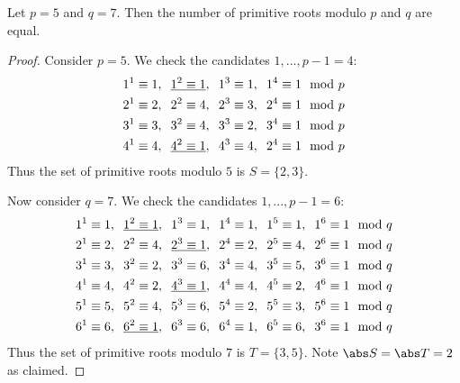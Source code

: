 \documentclass{article}
\begin{document}
\renewcommand{\hs}{\hspace{0.2cm}}
\begin{claim*}[3]
   Let $p=5$ and $q=7$. Then the number of primitive roots modulo $p$ and $q$ are equal.
   \begin{proof}
      Consider $p=5$. We check the candidates $1,...,p-1=4$:
      \begin{align*}
         1^1 \equiv 1,\hs \underline{1^2 \equiv 1},\hs 1^3 \equiv 1,\hs 1^4 \equiv 1 \mod p \\
         2^1 \equiv 2,\hs 2^2 \equiv 4,            \hs 2^3 \equiv 3,\hs 2^4 \equiv 1 \mod p             \\
         3^1 \equiv 3,\hs 3^2 \equiv 4,            \hs 3^3 \equiv 2,\hs 3^4 \equiv 1 \mod p             \\
         4^1 \equiv 4,\hs \underline{4^2 \equiv 1},\hs 4^3 \equiv 4,\hs 2^4 \equiv 1 \mod p
      \end{align*}
      Thus the set of primitive roots modulo $5$ is $S=\{2,3\}$.

      Now consider $q=7$. We check the candidates $1,...,p-1=6$:
      \begin{align*}
         1^1 \equiv 1,\hs \underline{1^2 \equiv 1},\hs 1^3 \equiv 1,             \hs 1^4 \equiv 1,\hs 1^5 \equiv 1,\hs 1^6 \equiv 1 \mod q \\
         2^1 \equiv 2,\hs 2^2 \equiv 4,            \hs \underline{2^3 \equiv 1}, \hs 2^4 \equiv 2,\hs 2^5 \equiv 4,\hs 2^6 \equiv 1 \mod q \\
         3^1 \equiv 3,\hs 3^2 \equiv 2,            \hs 3^3 \equiv 6,             \hs 3^4 \equiv 4,\hs 3^5 \equiv 5,\hs 3^6 \equiv 1 \mod q             \\
         4^1 \equiv 4,\hs 4^2 \equiv 2,            \hs \underline{4^3 \equiv 1}, \hs 4^4 \equiv 4,\hs 4^5 \equiv 2,\hs 4^6 \equiv 1 \mod q \\
         5^1 \equiv 5,\hs 5^2 \equiv 4,            \hs 5^3 \equiv 6,             \hs 5^4 \equiv 2,\hs 5^5 \equiv 3,\hs 5^6 \equiv 1 \mod q             \\
         6^1 \equiv 6,\hs \underline{6^2 \equiv 1},\hs 6^3 \equiv 6,             \hs 6^4 \equiv 1,\hs 6^5 \equiv 6,\hs 3^6 \equiv 1 \mod q
      \end{align*}
      Thus the set of primitive roots modulo $7$ is $T=\{3, 5\}$.
      Note $\abs S = \abs T = 2$ as claimed.
   \end{proof}
\end{claim*}
\end{document}
